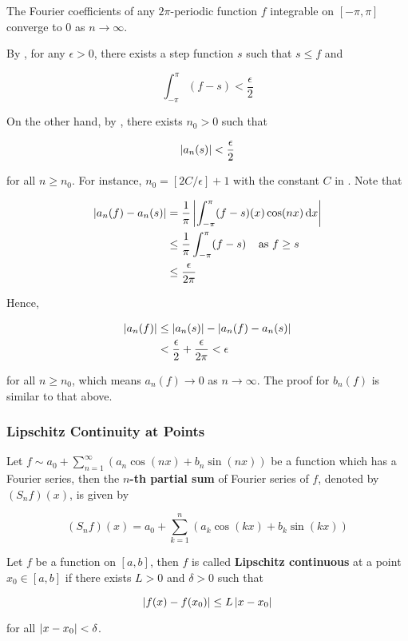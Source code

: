 \documentclass[a4paper,12pt]{article}
\begin{document}
\begin{thm}
  The Fourier coefficients of any $2\pi$-periodic function $f$ integrable on $[-\pi,\pi]$ converge to $0$ as $n\to\infty$.\n

  \prf By \rpst[\sctr{1}], for any $\epsilon>0$, there exists a step function $s$ such that $s\leq f$ and

  $$\int_{-\pi}^{\pi}(f-s)<\frac{\epsilon}{2}$$\s

  On the other hand, by \rpst[\sctr{2}], there exists $n_{0}>0$ such that

  $$\left| a_{n}(s)\right|<\frac{\epsilon}{2}$$\s

  for all $n\geq n_{0}$. For instance, $n_{0}=[2C/\epsilon]+1$ with the constant $C$ in \rpst[\sctr{2}]. Note that

  $$\begin{aligned}[t]
    \left| a_{n}(f)-a_{n}(s)\right|&=\frac{1}{\pi}\left| \int_{-\pi}^{\pi}(f-s)(x)\cos(nx)\,\mathrm{d} x\right|\\
    &\leq\frac{1}{\pi}\int_{-\pi}^{\pi}(f-s)\;\;\;\;\text{as }f\geq s\\
    &\leq\frac{\epsilon}{2\pi}
  \end{aligned}$$\s

  Hence,

  $$\begin{aligned}[t]
    \left| a_{n}(f)\right|&\leq\left| a_{n}(s)\right|-\left| a_{n}(f)-a_{n}(s)\right|\\
    &<\frac{\epsilon}{2}+\frac{\epsilon}{2\pi}<\epsilon
  \end{aligned}$$\s

  for all $n\geq n_{0}$, which means $a_{n}(f)\to 0$ as $n\to\infty$. The proof for $b_{n}(f)$ is similar to that above.
\end{thm}

\subsubsection{Lipschitz Continuity at Points}
\begin{dft}
  Let $f\sim a_{0}+\sum_{n=1}^{\infty}(a_{n}\cos(nx)+b_{n}\sin(nx))$ be a function which has a Fourier series, then the \textbf{$n$-th partial sum} of Fourier series of $f$, denoted by $(S_{n}f)(x)$, is given by

  $$(S_{n}f)(x)=a_{0}+\sum_{k=1}^{n}(a_{k}\cos(kx)+b_{k}\sin(kx))$$
\end{dft}\n

\begin{dft}
  Let $f$ be a function on $[a,b]$, then $f$ is called \textbf{Lipschitz continuous} at a point $x_{0}\in[a,b]$ if there exists $L>0$ and $\delta>0$ such that

  $$\left| f(x)-f(x_{0})\right|\leq L\left| x-x_{0}\right|$$\s

  for all $\left| x-x_{0}\right|<\delta$.
\end{dft}\n
\end{document}
